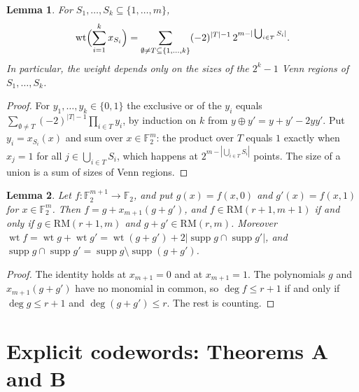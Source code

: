 \documentclass[11pt]{article}
\newtheorem{lemma}{Lemma}[section]
\theoremstyle{remark}
\newcommand{\F}{\mathbb F}
\newcommand{\RM}{\mathrm{RM}}
\DeclareMathOperator{\wt}{wt}
\DeclareMathOperator{\supp}{supp}
\begin{document}
\begin{lemma}\label{lem:ie}
For $S_1,\dots,S_k\subseteq\{1,\dots,m\}$,
\[
\wt\Bigl(\sum_{i=1}^kx_{S_i}\Bigr)=\sum_{\emptyset\ne T\subseteq\{1,\dots,k\}}
(-2)^{|T|-1}\,2^{m-|\bigcup_{i\in T}S_i|}.
\]
In particular, the weight depends only on the sizes of the $2^k-1$ Venn regions
of $S_1,\dots,S_k$.
\end{lemma}
\begin{proof}
For $y_1,\dots,y_k\in\{0,1\}$ the exclusive or of the $y_i$ equals
$\sum_{\emptyset\ne T}(-2)^{|T|-1}\prod_{i\in T}y_i$, by induction on $k$ from
$y\oplus y'=y+y'-2yy'$. Put $y_i=x_{S_i}(x)$ and sum over $x\in\F_2^m$: the
product over $T$ equals $1$ exactly when $x_j=1$ for all
$j\in\bigcup_{i\in T}S_i$, which happens at $2^{m-|\bigcup_{i\in T}S_i|}$
points. The size of a union is a sum of sizes of Venn regions.
\end{proof}

\begin{lemma}\label{lem:halves}
Let $f\colon\F_2^{m+1}\to\F_2$, and put $g(x)=f(x,0)$ and $g'(x)=f(x,1)$ for
$x\in\F_2^m$. Then $f=g+x_{m+1}(g+g')$, and $f\in\RM(r+1,m+1)$ if and only if
$g\in\RM(r+1,m)$ and $g+g'\in\RM(r,m)$. Moreover
$\wt f=\wt g+\wt g'=\wt(g+g')+2|\supp g\cap\supp g'|$, and
$\supp g\cap\supp g'=\supp g\setminus\supp(g+g')$.
\end{lemma}
\begin{proof}
The identity holds at $x_{m+1}=0$ and at $x_{m+1}=1$. The polynomials $g$ and
$x_{m+1}(g+g')$ have no monomial in common, so $\deg f\le r+1$ if and only if
$\deg g\le r+1$ and $\deg(g+g')\le r$. The rest is counting.
\end{proof}

\section{Explicit codewords: Theorems A and B}\label{sec:AB}
\end{document}
